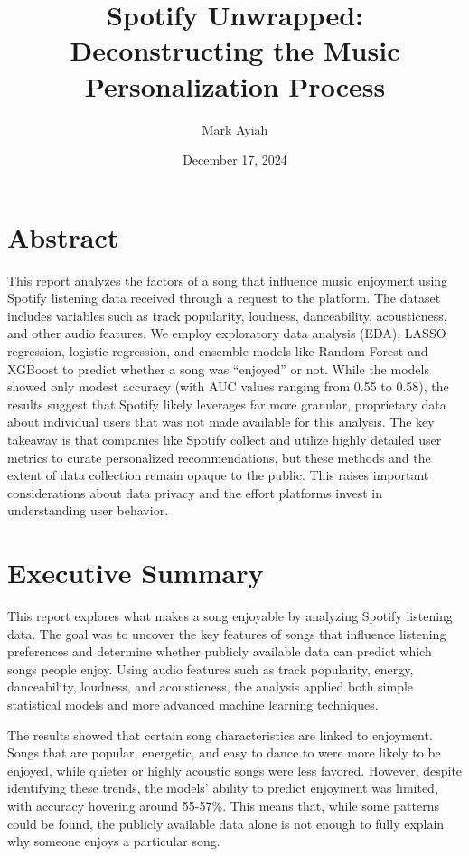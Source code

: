 \documentclass[11pt]{article}
\title{Spotify Unwrapped: Deconstructing the Music Personalization Process}
\author{Mark Ayiah}
\date{December 17, 2024}
\begin{document}
\maketitle

\maketitle
    
    

    
    \section{Abstract}\label{abstract}

This report analyzes the factors of a song that influence music
enjoyment using Spotify listening data received through a request to the
platform. The dataset includes variables such as track popularity,
loudness, danceability, acousticness, and other audio features. We
employ exploratory data analysis (EDA), LASSO regression, logistic
regression, and ensemble models like Random Forest and XGBoost to
predict whether a song was ``enjoyed'' or not. While the models showed
only modest accuracy (with AUC values ranging from 0.55 to 0.58), the
results suggest that Spotify likely leverages far more granular,
proprietary data about individual users that was not made available for
this analysis. The key takeaway is that companies like Spotify collect
and utilize highly detailed user metrics to curate personalized
recommendations, but these methods and the extent of data collection
remain opaque to the public. This raises important considerations about
data privacy and the effort platforms invest in understanding user
behavior.

    \section{Executive Summary}\label{executive-summary}

This report explores what makes a song enjoyable by analyzing Spotify
listening data. The goal was to uncover the key features of songs that
influence listening preferences and determine whether publicly available
data can predict which songs people enjoy. Using audio features such as
track popularity, energy, danceability, loudness, and acousticness, the
analysis applied both simple statistical models and more advanced
machine learning techniques.

The results showed that certain song characteristics are linked to
enjoyment. Songs that are popular, energetic, and easy to dance to were
more likely to be enjoyed, while quieter or highly acoustic songs were
less favored. However, despite identifying these trends, the models'
ability to predict enjoyment was limited, with accuracy hovering around
55-57\%. This means that, while some patterns could be found, the
publicly available data alone is not enough to fully explain why someone
enjoys a particular song.
\end{document}
